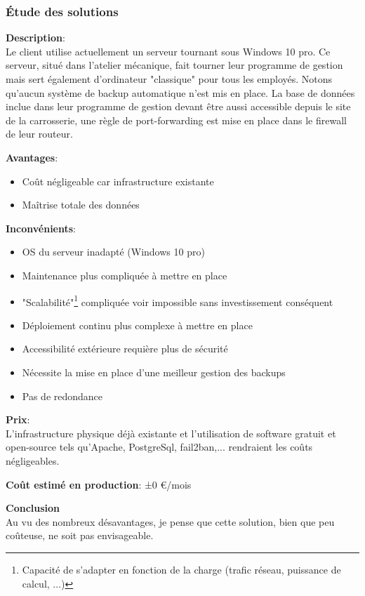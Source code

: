 \newpage
\subsubsection{Étude des solutions}

\textbf{Description}: \\ Le client utilise actuellement un serveur tournant sous Windows 10 pro. Ce serveur, situé dans l'atelier mécanique, fait tourner leur programme de gestion mais sert également d'ordinateur "classique" pour tous les employés. Notons qu'aucun système de backup automatique n'est mis en place. La base de données inclue dans leur programme de gestion devant être aussi accessible depuis le site de la carrosserie, une règle de port-forwarding est mise en place dans le firewall de leur routeur.

\newpara
\textbf{Avantages}:
\begin{itemize}
  \item Coût négligeable car infrastructure existante
  \item Maîtrise totale des données
\end{itemize}

\newpara
\textbf{Inconvénients}:
\begin{itemize}
  \item OS du serveur inadapté (Windows 10 pro)
  \item Maintenance plus compliquée à mettre en place
  \item "Scalabilité"\footnote{Capacité de s'adapter en fonction de la charge (trafic réseau, puissance de calcul, ...)} compliquée voir impossible sans investissement conséquent
  \item Déploiement continu plus complexe à mettre en place
  \item Accessibilité extérieure requière plus de sécurité
  \item Nécessite la mise en place d'une meilleur gestion des backups
  \item Pas de redondance
\end{itemize}

\newpara
\textbf{Prix}: \\ L'infrastructure physique déjà existante et l'utilisation de software gratuit et open-source tels qu'Apache, PostgreSql, fail2ban,... rendraient les coûts négligeables.

\newpara
\textbf{Coût estimé en production}: ±0 €/mois

\newpara
\textbf{Conclusion} \\ Au vu des nombreux désavantages, je pense que cette solution, bien que peu coûteuse, ne soit pas envisageable.

